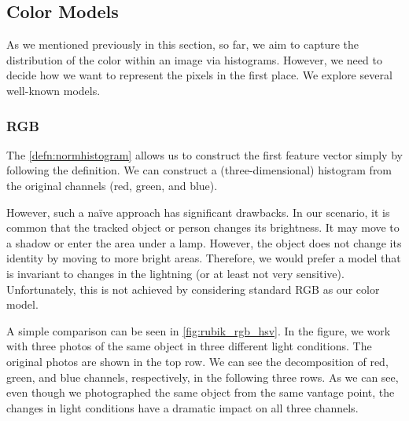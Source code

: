 
\subsection{Color Models}

As we mentioned previously in this section, so far, we aim to capture the distribution of the color within an image via histograms. However, we need to decide how we want to represent the pixels in the first place. We explore several well-known models.

\subsubsection{RGB}

The \autoref{defn:normhistogram} allows us to construct the first feature vector simply by following the definition. We can construct a (three-dimensional) histogram from the original channels (red, green, and blue).

However, such a naïve approach has significant drawbacks. In our scenario, it is common that the tracked object or person changes its brightness. It may move to a shadow or enter the area under a lamp. However, the object does not change its identity by moving to more bright areas. Therefore, we would prefer a model that is invariant to changes in the lightning (or at least not very sensitive). Unfortunately, this is not achieved by considering standard RGB as our color model.


A simple comparison can be seen in \autoref{fig:rubik_rgb_hsv}. In the figure, we work with three photos of the same object in three different light conditions. The original photos are shown in the top row. We can see the decomposition of red, green, and blue channels, respectively, in the following three rows. As we can see, even though we photographed the same object from the same vantage point, the changes in light conditions have a dramatic impact on all three channels.

